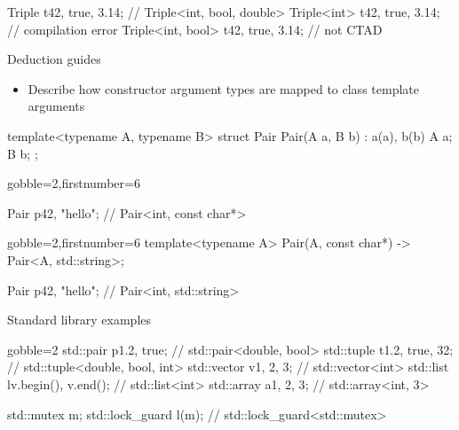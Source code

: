 \begin{advanced}
\begin{frame}[fragile]
\begin{cppcode*}{}
    Triple t{42, true, 3.14}; // Triple<int, bool, double>
    Triple<int> t{42, true, 3.14}; // compilation error
    Triple<int, bool> t{42, true, 3.14}; // not CTAD
  \end{cppcode*}
\end{frame}

\begin{frame}[fragile]
  \begin{block}{Deduction guides}
    \begin{itemize}
    \item Describe how constructor argument types are mapped to class template arguments
    \end{itemize}
  \end{block}
  \begin{cppcode}
    template<typename A, typename B>
    struct Pair {
     Pair(A a, B b) : a(a), b(b) {}
     A a; B b;
    };
  \end{cppcode}
  \begin{overprint}[\columnwidth]
    \begin{cppcode*}{gobble=2,firstnumber=6}



      Pair p{42, "hello"}; // Pair<int, const char*>
    \end{cppcode*}
    \begin{cppcode*}{gobble=2,firstnumber=6}
      template<typename A>
      Pair(A, const char*) -> Pair<A, std::string>;

      Pair p{42, "hello"}; // Pair<int, std::string>
    \end{cppcode*}
  \end{overprint}
\end{frame}

\begin{frame}[fragile]
  \begin{block}{Standard library examples}
    \begin{cppcode*}{gobble=2}
      std::pair p{1.2, true}; // std::pair<double, bool>
      std::tuple t{1.2, true, 32};
                        // std::tuple<double, bool, int>
      std::vector v{1, 2, 3}; // std::vector<int>
      std::list l{v.begin(), v.end()}; // std::list<int>
      std::array a{1, 2, 3}; // std::array<int, 3>

      std::mutex m;
      std::lock_guard l(m); // std::lock_guard<std::mutex>
    \end{cppcode*}
  \end{block}
\end{frame}

\end{advanced}

